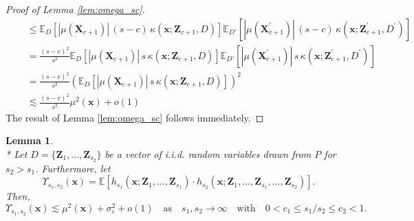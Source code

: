 \documentclass[letterpaper,10pt]{article}
\numberwithin{equation}{section}
\numberwithin{thm}{section}
\newtheorem{lem}{Lemma}
\numberwithin{lem}{section}
\numberwithin{cor}{section}
\newcommand{\E}{\mathbb{E}}
\newcommand{\1}{\mathbbm{1}}
\begin{document}
\begin{proof}[Proof of Lemma \ref{lem:omega_sc}]
\begin{equation}
\begin{aligned}
			 & \quad \leq \E_{D}\left[|\mu(\mathbf{X}_{c+1})|\, (s-c) \, \kappa\left(\mathbf{x}; \mathbf{Z}_{c+1}, D\right)\right]
			\E_{D'}\left[|\mu(\mathbf{X}_{c+1}^{\prime})|\, (s-c) \, \kappa\left(\mathbf{x}; \mathbf{Z}_{c+1}^{\prime}, D^{\prime}\right)\right]                                                                                      \\
			 & \quad = \frac{(s-c)^2}{s^2} \E_{D}\left[|\mu(\mathbf{X}_{c+1})|\, s \, \kappa\left(\mathbf{x}; \mathbf{Z}_{c+1}, D\right)\right]
			\E_{D'}\left[|\mu(\mathbf{X}_{c+1}^{\prime})|\, s \, \kappa\left(\mathbf{x}; \mathbf{Z}_{c+1}^{\prime}, D^{\prime}\right)\right]                                                                                          \\
			 & \quad = \frac{(s-c)^2}{s^2} \left(\E_{D}\left[|\mu(\mathbf{X}_{c+1})|\, s \, \kappa\left(\mathbf{x}; \mathbf{Z}_{c+1}, D\right)\right]\right)^2                                                                        \\
			 & \quad \lesssim \frac{(s-c)^2}{s^2}\mu^2(\mathbf{x}) + o(1)
		\end{aligned}
	\end{equation}
	The result of Lemma \ref{lem:omega_sc} follows immediately.
\end{proof}

\newpage
\begin{lem}\label{lem:upsilon_s}\mbox{}\\*
	Let $D = \{\mathbf{Z}_1, \dotsc, \mathbf{Z}_{s_2}\}$ be a vector of i.i.d. random variables drawn from $P$ for $s_2 > s_1$.
	Furthermore, let
	\begin{equation}
		\Upsilon_{s_1, s_2}\left(\mathbf{x}\right)
		= \E\left[h_{s_1}\left(\mathbf{x}; \mathbf{Z}_1, \ldots,  \mathbf{Z}_{s_1}\right) \cdot
			h_{s_2}\left(\mathbf{x}; \mathbf{Z}_1, \ldots,\mathbf{Z}_{s_1}, \ldots, \mathbf{Z}_{s_2}\right)\right].
	\end{equation}
	Then,
	\begin{equation}
		\Upsilon_{s_1, s_2}\left(\mathbf{x}\right)
		\lesssim \mu^{2}\left(\mathbf{x}\right) + \sigma^2_{\varepsilon} + o(1)
		\quad \text{as} \quad s_1, s_2 \rightarrow \infty
		\quad \text{with} \quad
		0 < c_1 \leq s_1 / s_2 \leq c_2 < 1.
	\end{equation}
\end{lem}
\end{document}
